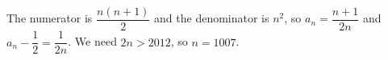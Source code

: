 The numerator is $\dfrac{n(n+1)}2$ and the denominator is $n^2$, so $a_n=\dfrac{n+1}{2n}$ and $a_n-\dfrac12=\dfrac1{2n}$. We need $2n>2012$, so $n=\boxed{1007}$.
